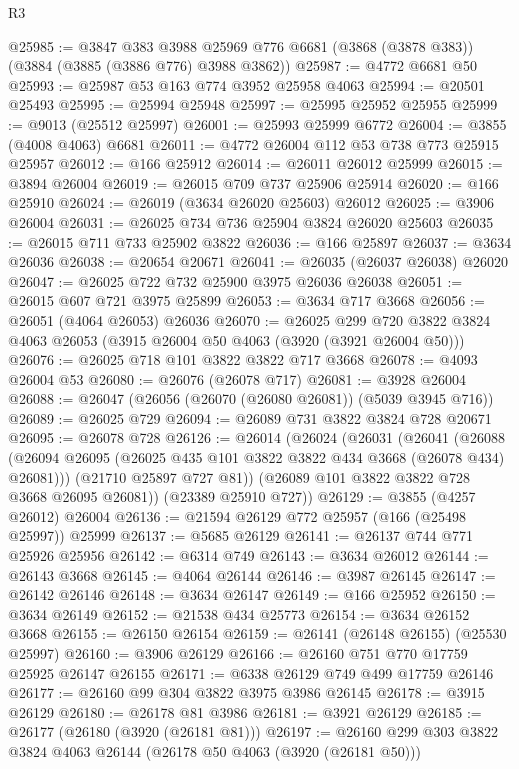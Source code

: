 \begin{lexlean}{R3}
\begin{coremodule}
@25985 := @3847
    @383
    @3988
    @25969
    @776
    @6681
    (@3868 (@3878 @383))
    (@3884 (@3885 (@3886 @776) @3988 @3862))
@25987 := @4772 @6681 @50
@25993 := @25987 @53 @163 @774 @3952 @25958 @4063
@25994 := @20501 @25493
@25995 := @25994 @25948
@25997 := @25995 @25952 @25955
@25999 := @9013 (@25512 @25997)
@26001 := @25993 @25999 @6772
@26004 := @3855 (@4008 @4063) @6681
@26011 := @4772 @26004 @112 @53 @738 @773 @25915 @25957
@26012 := @166 @25912
@26014 := @26011 @26012 @25999
@26015 := @3894 @26004
@26019 := @26015 @709 @737 @25906 @25914
@26020 := @166 @25910
@26024 := @26019 (@3634 @26020 @25603) @26012
@26025 := @3906 @26004
@26031 := @26025 @734 @736 @25904 @3824 @26020 @25603
@26035 := @26015 @711 @733 @25902 @3822
@26036 := @166 @25897
@26037 := @3634 @26036
@26038 := @20654 @20671
@26041 := @26035 (@26037 @26038) @26020
@26047 := @26025 @722 @732 @25900 @3975 @26036 @26038
@26051 := @26015 @607 @721 @3975 @25899
@26053 := @3634 @717 @3668
@26056 := @26051 (@4064 @26053) @26036
@26070 := @26025
    @299
    @720
    @3822
    @3824
    @4063
    @26053
    (@3915 @26004 @50 @4063 (@3920 (@3921 @26004 @50)))
@26076 := @26025 @718 @101 @3822 @3822 @717 @3668
@26078 := @4093 @26004 @53
@26080 := @26076 (@26078 @717)
@26081 := @3928 @26004
@26088 := @26047 (@26056 (@26070 (@26080 @26081)) (@5039 @3945 @716))
@26089 := @26025 @729
@26094 := @26089 @731 @3822 @3824 @728 @20671
@26095 := @26078 @728
@26126 := @26014
    (@26024
      (@26031
        (@26041
          (@26088 (@26094 @26095 (@26025 @435 @101 @3822 @3822 @434 @3668 (@26078 @434) @26081)))
          (@21710 @25897 @727 @81))
        (@26089 @101 @3822 @3822 @728 @3668 @26095 @26081))
      (@23389 @25910 @727))
@26129 := @3855 (@4257 @26012) @26004
@26136 := @21594 @26129 @772 @25957 (@166 (@25498 @25997)) @25999
@26137 := @5685 @26129
@26141 := @26137 @744 @771 @25926 @25956
@26142 := @6314 @749
@26143 := @3634 @26012
@26144 := @26143 @3668
@26145 := @4064 @26144
@26146 := @3987 @26145
@26147 := @26142 @26146
@26148 := @3634 @26147
@26149 := @166 @25952
@26150 := @3634 @26149
@26152 := @21538 @434 @25773
@26154 := @3634 @26152 @3668
@26155 := @26150 @26154
@26159 := @26141 (@26148 @26155) (@25530 @25997)
@26160 := @3906 @26129
@26166 := @26160 @751 @770 @17759 @25925 @26147 @26155
@26171 := @6338 @26129 @749 @499 @17759 @26146
@26177 := @26160 @99 @304 @3822 @3975 @3986 @26145
@26178 := @3915 @26129
@26180 := @26178 @81 @3986
@26181 := @3921 @26129
@26185 := @26177 (@26180 (@3920 (@26181 @81)))
@26197 := @26160 @299 @303 @3822 @3824 @4063 @26144 (@26178 @50 @4063 (@3920 (@26181 @50)))

\end{coremodule}
\end{lexlean}
